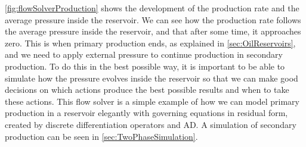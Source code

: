 \autoref{fig:flowSolverProduction} shows the development of the production rate and the average pressure inside the reservoir. We can see how the production rate follows the average pressure inside the reservoir, and that after some time, it approaches zero. This is when primary production ends, as explained in \autoref{sec:OilReservoirs}, and we need to apply external pressure to continue production in secondary production. To do this in the best possible way, it is important to be able to simulate how the pressure evolves inside the reservoir so that we can make good decisions on which actions produce the best possible results and when to take these actions. This flow solver is a simple example of how we can model primary production in a reservoir elegantly with governing equations in residual form, created by discrete differentiation operators and AD. A simulation of secondary production can be seen in \autoref{sec:TwoPhaseSimulation}.
